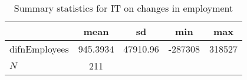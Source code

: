 \begin{table}[htbp]\centering
\def\sym#1{\ifmmode^{#1}\else\(^{#1}\)\fi}
\caption{Summary statistics for IT on changes in employment}
\begin{tabular}{l*{1}{cccc}}
\hline\hline
            &        mean&          sd&         min&         max\\
\hline
difnEmployees&    945.3934&    47910.96&     -287308&      318527\\
\hline
\(N\)       &         211&            &            &            \\
\hline\hline
\end{tabular}
\end{table}
